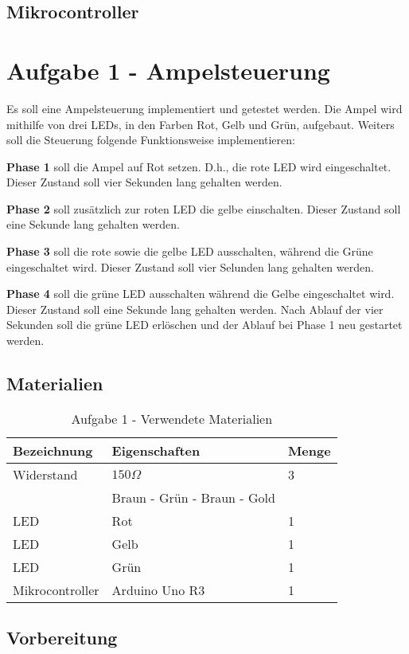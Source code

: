 \documentclass[11pt]{article}
\begin{document}
    \subsection{Mikrocontroller}
    \label{subsec:mikrocontroller}



    \section{Aufgabe 1 - Ampelsteuerung}
    \label{sec:aufgabe-1}

    Es soll eine Ampelsteuerung implementiert und getestet werden.
    Die Ampel wird mithilfe von drei LEDs, in den Farben Rot, Gelb und Grün, aufgebaut.
    Weiters soll die Steuerung folgende Funktionsweise implementieren:

    \textbf{Phase 1} soll die Ampel auf Rot setzen.
    D.h., die rote LED wird eingeschaltet.
    Dieser Zustand soll vier Sekunden lang gehalten werden.

    \textbf{Phase 2} soll zusätzlich zur roten LED die gelbe einschalten.
    Dieser Zustand soll eine Sekunde lang gehalten werden.

    \textbf{Phase 3} soll die rote sowie die gelbe LED ausschalten, während die Grüne eingeschaltet wird.
    Dieser Zustand soll vier Selunden lang gehalten werden.

    \textbf{Phase 4} soll die grüne LED ausschalten während die Gelbe eingeschaltet wird.
    Dieser Zustand soll eine Sekunde lang gehalten werden.
    Nach Ablauf der vier Sekunden soll die grüne LED erlöschen und der Ablauf bei Phase 1 neu gestartet werden.

    \subsection{Materialien}
    \label{subsec:A1-materialien}

    \begin{table}[h]
        \centering
        \caption{Aufgabe 1 - Verwendete Materialien}
        \label{tab:a1-materialien}
        \begin{tabular}{| l | l | l |}
            \hline
            Bezeichnung & Eigenschaften & Menge \\
            \hline
            Widerstand  & $150\Omega$   & 3     \\
                        & Braun - Grün - Braun - Gold & \\
            LED & Rot & 1 \\
            LED & Gelb & 1 \\
            LED & Grün & 1 \\
            Mikrocontroller & Arduino Uno R3 & 1 \\
            \hline
        \end{tabular}
    \end{table}

    \subsection{Vorbereitung}
    \label{subsec:A1-vorbereitung}

    \printbibliography
\end{document}
